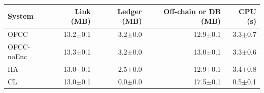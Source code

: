 \begin{tabular}{@{}lrrrr@{}}
\toprule
System & Link (MB) & Ledger (MB) & Off-chain or DB (MB) & CPU (s) \\
\midrule
OFCC & 13.2$\pm$0.1 & 3.2$\pm$0.0 & 12.9$\pm$0.1 & 3.3$\pm$0.7 \\
OFCC-noEnc & 13.3$\pm$0.1 & 3.2$\pm$0.0 & 13.0$\pm$0.1 & 3.3$\pm$0.6 \\
HA & 13.0$\pm$0.1 & 2.5$\pm$0.0 & 12.9$\pm$0.1 & 3.4$\pm$0.8 \\
CL & 13.0$\pm$0.1 & 0.0$\pm$0.0 & 17.5$\pm$0.1 & 0.5$\pm$0.1 \\
\bottomrule
\end{tabular}
